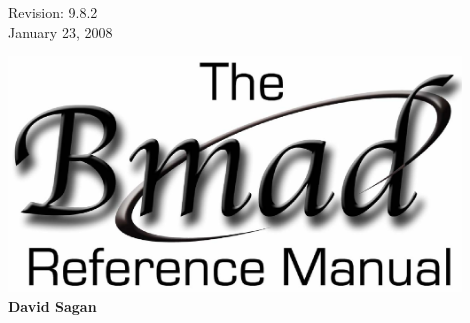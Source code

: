 \thispagestyle{empty}

\begin{flushright}
\large
  Revision: 9.8.2 \\
  January 23, 2008 \\
\end{flushright}

\vfill

{
\begin{center}
\includegraphics[width=12cm]{bmad-ref-manual.eps} \\
\vskip 0.3in
\huge\bf David Sagan
\end{center}
}

\vfill
\break

